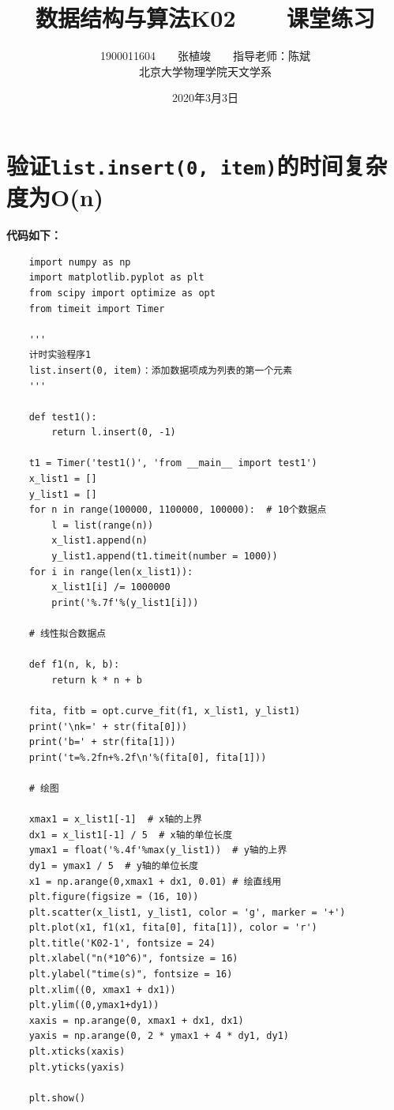\documentclass[a4 paper,fontset=windows]{ctexart}
\begin{document}
	\title{\textbf{数据结构与算法K02\ \ \ \ 课堂练习}}
	\author{1900011604\ \ \ \ 张植竣\ \ \ \ 指导老师：陈斌\\北京大学物理学院天文学系}
	\date{2020年3月3日}

	\maketitle

	\section{验证\texttt{list.insert(0, item)}的时间复杂度为O(n)}
	
	\textbf{代码如下：}
	\begin{lstlisting}
	import numpy as np
	import matplotlib.pyplot as plt
	from scipy import optimize as opt
	from timeit import Timer
	
	'''
	计时实验程序1
	list.insert(0, item)：添加数据项成为列表的第一个元素
	'''

	def test1():
		return l.insert(0, -1)
	
	t1 = Timer('test1()', 'from __main__ import test1')
	x_list1 = []
	y_list1 = []
	for n in range(100000, 1100000, 100000):  # 10个数据点
		l = list(range(n))
		x_list1.append(n)
		y_list1.append(t1.timeit(number = 1000))
	for i in range(len(x_list1)):
		x_list1[i] /= 1000000
		print('%.7f'%(y_list1[i]))
	
	# 线性拟合数据点

	def f1(n, k, b):
		return k * n + b
	
	fita, fitb = opt.curve_fit(f1, x_list1, y_list1)
	print('\nk=' + str(fita[0]))
	print('b=' + str(fita[1]))
	print('t=%.2fn+%.2f\n'%(fita[0], fita[1]))
	
	# 绘图

	xmax1 = x_list1[-1]  # x轴的上界
	dx1 = x_list1[-1] / 5  # x轴的单位长度
	ymax1 = float('%.4f'%max(y_list1))  # y轴的上界
	dy1 = ymax1 / 5  # y轴的单位长度
	x1 = np.arange(0,xmax1 + dx1, 0.01) # 绘直线用
	plt.figure(figsize = (16, 10))
	plt.scatter(x_list1, y_list1, color = 'g', marker = '+')
	plt.plot(x1, f1(x1, fita[0], fita[1]), color = 'r')
	plt.title('K02-1', fontsize = 24)
	plt.xlabel("n(*10^6)", fontsize = 16)
	plt.ylabel("time(s)", fontsize = 16)
	plt.xlim((0, xmax1 + dx1))
	plt.ylim((0,ymax1+dy1))
	xaxis = np.arange(0, xmax1 + dx1, dx1)
	yaxis = np.arange(0, 2 * ymax1 + 4 * dy1, dy1)
	plt.xticks(xaxis)
	plt.yticks(yaxis)
	
	plt.show()
	\end{lstlisting}
	
\end{document}
